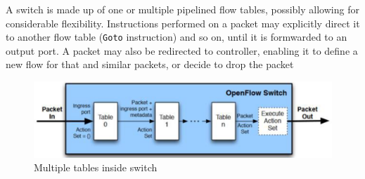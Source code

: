 A switch is made up of one or multiple pipelined flow tables, possibly allowing for considerable flexibility.
Instructions performed on a packet may explicitly direct it to another flow table (\texttt{Goto} instruction) and so on, until it is formwarded to an output port.
A packet may also be redirected to controller, enabling it to define a new flow for that and similar packets, or decide to drop the packet
\begin{figure}[htbp]
   \centering
   \includegraphics{images/openflow_switchtables.png}
   \caption{Multiple tables inside switch}
   \label{fig:openflow_switchtables}
\end{figure}


